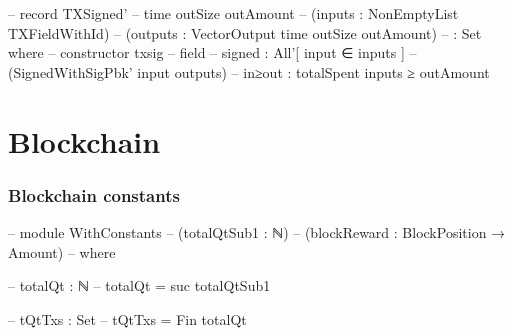 \documentclass{beamer}
\begin{document}
\begin{frame}
\begin{code}

    -- record TXSigned'
    --   {time} {outSize} {outAmount}
    --   (inputs    : NonEmptyList TXFieldWithId)
    --   (outputs   : VectorOutput time outSize outAmount)
    --     : Set where
    --   constructor txsig
    --   field
    --     signed   : All'[ input ∈ inputs ]
    --       (SignedWithSigPbk' input outputs)
    --     in≥out : totalSpent inputs ≥ outAmount

\end{code}
\end{frame}

\section{Blockchain}

\begin{frame}
  \frametitle{Blockchain constants}
\begin{code}
    -- module WithConstants
    --   (totalQtSub1 : ℕ)
    --   (blockReward : BlockPosition → Amount)
    --   where

    --   totalQt : ℕ
    --   totalQt = suc totalQtSub1

    --   tQtTxs : Set
    --   tQtTxs = Fin totalQt
\end{code}
\end{frame}
\end{document}
